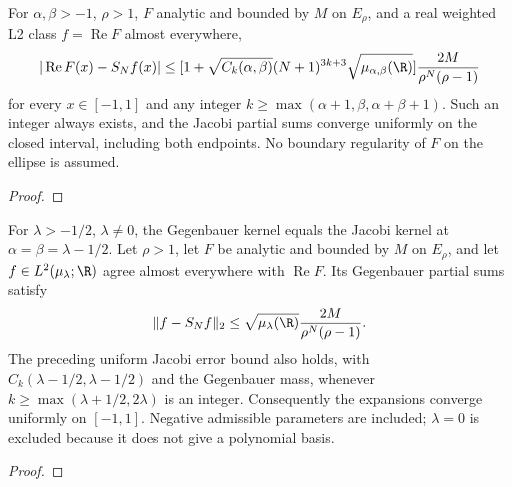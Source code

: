 \begin{theorem}
\label{thm:jacobi-uniform-approximation}
\leanok
For $\alpha,\beta>-1$, $\rho>1$, $F$ analytic and bounded by $M$ on $E_\rho$,
and a real weighted L2 class $f=\operatorname{Re}F$ almost everywhere,
\[ |\operatorname{Re}F(x)-S_Nf(x)|\le
 [1+\sqrt{C_k(\alpha,\beta)}(N+1)^{3k+3}\sqrt{\mu_{\alpha,\beta}(\R)}]
 \frac{2M}{\rho^N(\rho-1)} \]
for every $x\in[-1,1]$ and any integer
$k\ge\max(\alpha+1,\beta,\alpha+\beta+1)$.
Such an integer always exists, and the Jacobi partial sums converge uniformly
on the closed interval, including both endpoints. No boundary regularity of
$F$ on the ellipse is assumed.
\end{theorem}
\begin{proof}
\leanok
\end{proof}

\begin{theorem}
\label{thm:gegenbauer-analytic-approximation}
\leanok
For $\lambda>-1/2$, $\lambda\ne0$, the Gegenbauer kernel equals the Jacobi kernel
at $\alpha=\beta=\lambda-1/2$. Let $\rho>1$, let $F$ be analytic and bounded by
$M$ on $E_\rho$, and let $f\in L^2(\mu_\lambda;\R)$ agree almost everywhere with
$\operatorname{Re}F$. Its Gegenbauer partial sums satisfy
\[ \|f-S_Nf\|_2\le\sqrt{\mu_\lambda(\R)}\frac{2M}{\rho^N(\rho-1)}. \]
The preceding uniform Jacobi error bound also holds, with
$C_k(\lambda-1/2,\lambda-1/2)$ and the Gegenbauer mass, whenever
$k\ge\max(\lambda+1/2,2\lambda)$ is an integer. Consequently the expansions
converge uniformly on $[-1,1]$. Negative admissible parameters are included;
$\lambda=0$ is excluded because it does not give a polynomial basis.
\end{theorem}
\begin{proof}
\leanok
\end{proof}

